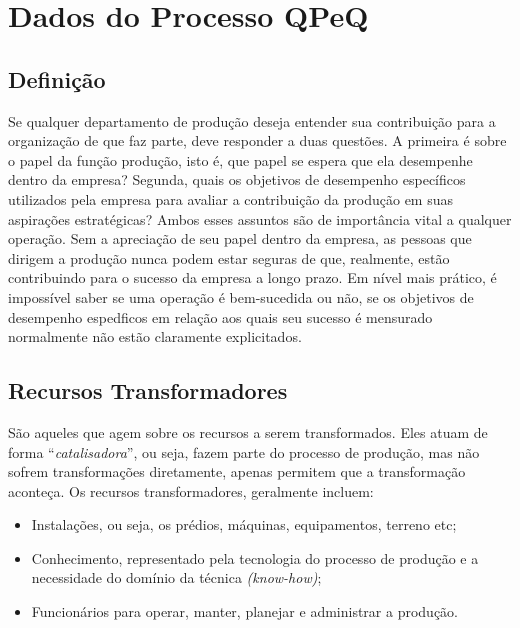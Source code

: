 \chapter[Dados do Processo QPeQ]{Dados do Processo QPeQ}
\label{chap:dados}
	
	\section[Definição]{Definição}
	\label{sec:dados_definicao}

	Se qualquer departamento de produção deseja entender sua contribuição para a organização de que faz parte, deve responder a duas questões. A primeira é sobre o papel da função produção, isto é, que papel se espera que ela desempenhe dentro da empresa? Segunda, quais os objetivos de desempenho específicos utilizados pela empresa para avaliar a contribuição da produção em suas aspirações estratégicas? Ambos esses assuntos são de importância vital a qualquer operação. Sem a apreciação de seu papel dentro da empresa, as pessoas que dirigem a produção nunca podem estar seguras de que, realmente, estão contribuindo para o sucesso da empresa a longo prazo. Em nível mais prático, é impossível saber se uma operação é bem-sucedida ou não, se os objetivos de desempenho espedficos em relação aos quais seu sucesso é mensurado normalmente não estão claramente explicitados. \cite{slack}

	\section[Recursos Transformadores]{Recursos Transformadores}
	\label{sec:dados_transformadores}

		São aqueles que agem sobre os recursos a serem transformados. Eles atuam de forma “\emph{catalisadora}”, ou seja, fazem parte do processo de produção, mas não sofrem transformações diretamente, apenas permitem que a transformação aconteça. Os recursos transformadores, geralmente incluem: 

		\begin{itemize}
			\item{Instalações, ou seja, os prédios, máquinas, equipamentos, terreno etc;}
			\item{Conhecimento, representado pela tecnologia do processo de produção e a necessidade do domínio da técnica \emph{(know-how)};}
			\item{Funcionários para operar, manter, planejar e administrar a produção.}
		\end{itemize}

